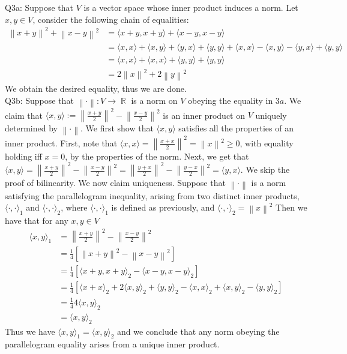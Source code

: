 \documentclass[letterpaper]{article}
\DeclareMathOperator{\R}{\mathbb{R}}
\newcommand{\lan}{\langle}
\newcommand{\ran}{\rangle}
\newcommand{\norm}[1]{\left\lVert#1\right\rVert}
\newcommand{\inn}[1]{\lan#1\ran}
\begin{document}
\noindent Q3a:
Suppose that $V$ is a vector space whose inner product induces a norm. Let $x,y\in V$, consider the following chain of equalities: 
\begin{align*}
 \norm{x+y}^2 + \norm{x-y}^2 &= \inn{x+y,x+y} + \inn{x-y,x-y} \tag{by the defintion of the norm}
\\ & =  \inn{x,x} +\inn{x,y} + \inn{y,x} + \inn{y,y} + \inn{x,x} - \inn{x,y} -\inn{y,x} + \inn{y,y} \tag{by linearity}
\\ & = \inn{x,x} +\inn{x,x} + \inn{y,y} +\inn{y,y}
\\ & = 2\norm{x}^2 + 2\norm{y}^2 \tag{by definition of the norm}
\end{align*}
We obtain the desired equality, thus we are done. 
\newline \\ Q3b:
Suppose that $\norm{\cdot}:V\rightarrow \R$ is a norm on $V$ obeying the equality in $3a$. We claim that $\inn{x,y}:= \norm{\frac{x+y}{2}}^2 - \norm{\frac{x-y}{2}}^2$ is an inner product on $V$ uniquely determined by $\norm{\cdot}$. We first show that $\inn{x,y}$ satisfies all the properties of an inner product. 
First, note that $\inn{x,x} = \norm{\frac{x+x}{2}}^2 = \norm{x}^2\geq 0$, with equality holding iff $x=0$, by the properties of the norm. 
Next, we get that $\inn{x,y} = \norm{\frac{x+y}{2}}^2 - \norm{\frac{x-y}{2}}^2 = \norm{\frac{y+x}{2}}^2 - \norm{\frac{y-x}{2}}^2 = \inn{y,x}$. 
We skip the proof of bilinearity. We now claim uniqueness. Suppose that $\norm{\cdot}$ is a norm satisfying the parallelogram inequality, arising from two distinct inner products, $\inn{\cdot,\cdot}_1$ and $\inn{\cdot,\cdot}_2$, 
where $\inn{\cdot,\cdot}_1$ is defined as previously, and $\inn{\cdot,\cdot}_2= \norm{x}^2$
Then we have that for any $x,y\in V$ 
\begin{align*} 
\inn{x,y}_1 & =\norm{\frac{x+y}{2}}^2 -\norm{\frac{x-y}{2}}^2
\\ & =\frac{1}{4}[\norm{x+y}^2 -\norm{x-y}^2]
\\ & = \frac{1}{4}[\inn{x+y,x+y}_2-\inn{x-y,x-y}_2]
\\ & = \frac{1}{4}[\inn{x+x}_2 + 2\inn{x,y}_2 + \inn{y,y}_2 -\inn{x,x}_2 +\inn{x,y}_2-\inn{y,y}_2]
\\ & = \frac{1}{4}4\inn{x,y}_2
\\ & = \inn{x,y}_2
\end{align*}
Thus we have $\inn{x,y}_1=\inn{x,y}_2$ and we conclude that any norm obeying the parallelogram equality arises from a unique inner product.
\end{document}
